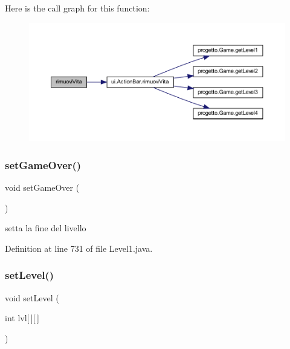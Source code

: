 Here is the call graph for this function\+:\nopagebreak
\begin{figure}[H]
\begin{center}
\leavevmode
\includegraphics[width=350pt]{classscenes_1_1_level1_a484775c889ccd8602b66ad795b141534_cgraph}
\end{center}
\end{figure}
\mbox{\label{classscenes_1_1_level1_a49e1d0816e9e0cabfb855147f399f5b5}} 
\subsubsection{\texorpdfstring{set\+Game\+Over()}{setGameOver()}}
{\footnotesize\ttfamily void set\+Game\+Over (\begin{DoxyParamCaption}{ }\end{DoxyParamCaption})}



setta la fine del livello 



Definition at line 731 of file Level1.\+java.

\mbox{\label{classscenes_1_1_level1_afdd7363804bf6696ce4a46d6448844ed}} 
\subsubsection{\texorpdfstring{set\+Level()}{setLevel()}}
{\footnotesize\ttfamily void set\+Level (\begin{DoxyParamCaption}\item[{int}]{lvl\mbox{[}$\,$\mbox{]}\mbox{[}$\,$\mbox{]} }\end{DoxyParamCaption})}



